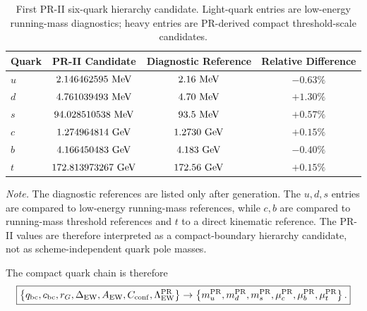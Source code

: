\documentclass[11pt]{article}
\renewcommand{\arraystretch}{1.22}
\renewcommand{\arraystretch}{1.4}
\begin{document}
\begin{table}[H]
\centering
\caption{First PR-II six-quark hierarchy candidate. Light-quark entries are low-energy running-mass diagnostics; heavy entries are PR-derived compact threshold-scale candidates.}
\label{tab:pr2_six_quark_candidate_main}
\small
\renewcommand{\arraystretch}{1.25}
\begin{tabular}{lccc}
\hline
\textbf{Quark} & \textbf{PR-II Candidate} & \textbf{Diagnostic Reference} & \textbf{Relative Difference} \\ \hline
\(u\) 
& \(2.146462595\ {\rm MeV}\) 
& \(2.16\ {\rm MeV}\) 
& \(-0.63\%\) \\

\(d\) 
& \(4.761039493\ {\rm MeV}\) 
& \(4.70\ {\rm MeV}\) 
& \(+1.30\%\) \\

\(s\) 
& \(94.028510538\ {\rm MeV}\) 
& \(93.5\ {\rm MeV}\) 
& \(+0.57\%\) \\

\(c\) 
& \(1.274964814\ {\rm GeV}\) 
& \(1.2730\ {\rm GeV}\) 
& \(+0.15\%\) \\

\(b\) 
& \(4.166450483\ {\rm GeV}\) 
& \(4.183\ {\rm GeV}\) 
& \(-0.40\%\) \\

\(t\) 
& \(172.813973267\ {\rm GeV}\) 
& \(172.56\ {\rm GeV}\) 
& \(+0.15\%\) \\ \hline
\end{tabular}

\vspace{0.4em}
\begin{minipage}{0.92\textwidth}
\footnotesize
\textit{Note.}
The diagnostic references are listed only after generation. 
The \(u,d,s\) entries are compared to low-energy running-mass references, while \(c,b\) are compared to running-mass threshold references and \(t\) to a direct kinematic reference. 
The PR-II values are therefore interpreted as a compact-boundary hierarchy candidate, not as scheme-independent quark pole masses.
\end{minipage}
\end{table}

The compact quark chain is therefore
\begin{equation}
\boxed{
\left\{
q_{\rm bc},
c_{\rm bc},
r_G,
\Delta_{\rm EW},
A_{\rm EW},
C_{\rm conf},
\Lambda_{\rm EW}^{\rm PR}
\right\}
\rightarrow
\left\{
m_u^{\rm PR},
m_d^{\rm PR},
m_s^{\rm PR},
\mu_c^{\rm PR},
\mu_b^{\rm PR},
\mu_t^{\rm PR}
\right\}.
}
\end{equation}
\end{document}
